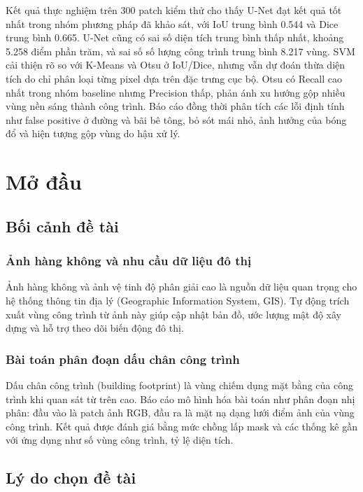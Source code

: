 \documentclass[12pt,a4paper]{report}
\begin{document}
Kết quả thực nghiệm trên 300 patch kiểm thử cho thấy U-Net đạt kết quả tốt nhất trong nhóm phương pháp đã khảo sát, với IoU trung bình 0.544 và Dice trung bình 0.665. U-Net cũng có sai số diện tích trung bình thấp nhất, khoảng 5.258 điểm phần trăm, và sai số số lượng công trình trung bình 8.217 vùng. SVM cải thiện rõ so với K-Means và Otsu ở IoU/Dice, nhưng vẫn dự đoán thừa diện tích do chỉ phân loại từng pixel dựa trên đặc trưng cục bộ. Otsu có Recall cao nhất trong nhóm baseline nhưng Precision thấp, phản ánh xu hướng gộp nhiều vùng nền sáng thành công trình. Báo cáo đồng thời phân tích các lỗi định tính như false positive ở đường và bãi bê tông, bỏ sót mái nhỏ, ảnh hưởng của bóng đổ và hiện tượng gộp vùng do hậu xử lý.

\chapter*{Mở đầu}

\section*{Bối cảnh đề tài}

\subsection*{Ảnh hàng không và nhu cầu dữ liệu đô thị}

Ảnh hàng không và ảnh vệ tinh độ phân giải cao là nguồn dữ liệu quan trọng cho hệ thống thông tin địa lý (Geographic Information System, GIS). Tự động trích xuất vùng công trình từ ảnh này giúp cập nhật bản đồ, ước lượng mật độ xây dựng và hỗ trợ theo dõi biến động đô thị.

\subsection*{Bài toán phân đoạn dấu chân công trình}

Dấu chân công trình (building footprint) là vùng chiếm dụng mặt bằng của công trình khi quan sát từ trên cao. Báo cáo mô hình hóa bài toán như phân đoạn nhị phân: đầu vào là patch ảnh RGB, đầu ra là mặt nạ dạng lưới điểm ảnh của vùng công trình. Kết quả được đánh giá bằng mức chồng lấp mask và các thống kê gần với ứng dụng như số vùng công trình, tỷ lệ diện tích.

\section*{Lý do chọn đề tài}
\end{document}
